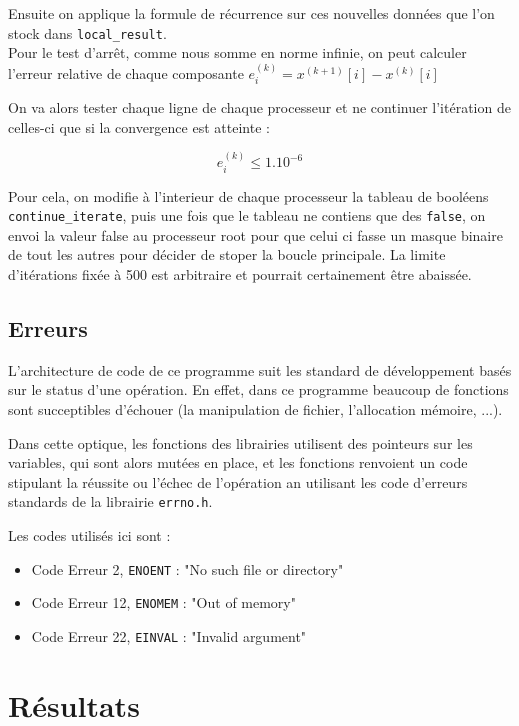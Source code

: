 \documentclass[11pt, a4paper]{article}
\begin{document}
Ensuite on applique la formule de récurrence sur ces nouvelles données que l'on stock dans \texttt{local\_result}.\\

Pour le test d'arr\^et, comme nous somme en norme infinie, on peut calculer l'erreur relative de chaque composante $e^{(k)}_{i} = x^{(k+1)}[i] - x^{(k)}[i]$

On va alors tester chaque ligne de chaque processeur et ne continuer l'itération de celles-ci que si la convergence est atteinte :

\[
e^{(k)}_{i} \leq 1.10^{-6}
\]

Pour cela, on modifie à l'interieur de chaque processeur la tableau de booléens \texttt{continue\_iterate}, puis une fois que le tableau ne contiens que des \texttt{false}, on envoi la valeur false au processeur root pour que celui ci fasse un masque binaire de tout les autres pour décider de stoper la boucle principale. La limite d'itérations fixée à 500 est arbitraire et pourrait certainement \^etre abaissée.

\subsection{Erreurs} \label{err}

L'architecture de code de ce programme suit les standard de développement basés sur le status d'une opération. En effet, dans ce programme beaucoup de fonctions sont succeptibles d'échouer (la manipulation de fichier, l'allocation mémoire, ...).

Dans cette optique, les fonctions des librairies  utilisent des pointeurs sur les variables, qui sont alors mutées en place, et les fonctions renvoient un code stipulant la réussite ou l'échec de l'opération an utilisant les code d'erreurs standards de la librairie \texttt{errno.h}.

Les codes utilisés ici sont :
\begin{itemize}
    \item Code Erreur 2, \texttt{ENOENT} : "No such file or directory"
    \item Code Erreur 12, \texttt{ENOMEM} : "Out of memory"
    \item Code Erreur 22, \texttt{EINVAL} : "Invalid argument"
\end{itemize}

\newpage

\section{Résultats}
\end{document}
